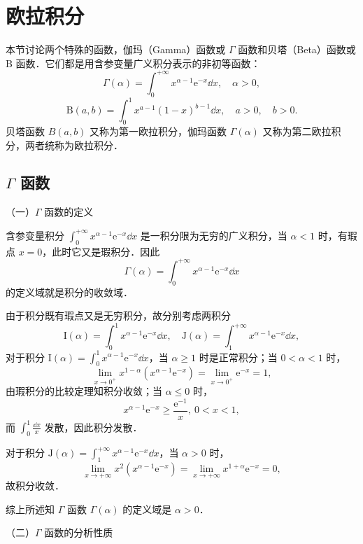 \section{欧拉积分}

本节讨论两个特殊的函数，伽玛（Gamma）函数或 $\Gamma$ 函数和贝塔（Beta）函数或 B 函数．它们都是用含参变量广义积分表示的非初等函数：
\[
\Gamma(\alpha)=\int_{0}^{+\infty}x^{\alpha-1}\mathrm{e}^{-x}\dd x,\quad\alpha>0,
\]
\[
\mathrm{B}(a,b)=\int_{0}^{1}x^{a-1}(1-x)^{b-1}\dd x,\quad a>0,\quad b>0.
\]
贝塔函数 $B(a,b)$ 又称为第一欧拉积分，伽玛函数 $\Gamma(\alpha)$ 又称为第二欧拉积分，两者统称为欧拉积分．

\subsection{$\Gamma$ 函数}

（一）$\Gamma$ 函数的定义

含参变量积分 $\displaystyle\int_{0}^{+\infty}x^{\alpha-1}\mathrm{e}^{-x}\dd x$ 是一积分限为无穷的广义积分，当 $\alpha<1$ 时，有瑕点 $x=0$，此时它又是瑕积分．因此
\[
\Gamma(\alpha)=\int_{0}^{+\infty}x^{\alpha-1}\mathrm{e}^{-x}\dd x
\]
的定义域就是积分的收敛域．

由于积分既有瑕点又是无穷积分，故分别考虑两积分
\[
\mathrm{I}(\alpha)=\int_{0}^{1}x^{\alpha-1}\mathrm{e}^{-x}\dd x,\quad \mathrm{J}(\alpha)=\int_{1}^{+\infty}x^{\alpha-1}\mathrm{e}^{-x}\dd x,
\]
对于积分 $\mathrm{I}(\alpha)=\displaystyle\int_{0}^{1}x^{\alpha-1}\mathrm{e}^{-x}\dd x$，当 $\alpha\geqslant 1$ 时是正常积分；当 $0<\alpha<1$ 时，
\[
\lim_{x\to 0^{+}}x^{1-\alpha}\left(x^{\alpha-1}\mathrm{e}^{-x}\right)=\lim_{x\to 0^{+}}\mathrm{e}^{-x}=1,
\]
由瑕积分的比较定理知积分收敛；当 $\alpha\leqslant 0$ 时，
\[
x^{\alpha-1}\mathrm{e}^{-x}\geqslant\frac{\mathrm{e}^{-1}}{x},\ 0<x<1,
\]
而 $\displaystyle\int_{0}^{1}\frac{\dd x}{x}$ 发散，因此积分发散．

对于积分 $\mathrm{J}(\alpha)=\displaystyle\int_{1}^{+\infty}x^{\alpha-1}\mathrm{e}^{-x}\dd x$，当 $\alpha>0$ 时，
\[
\lim_{x\to+\infty}x^{2}\left(x^{\alpha-1}\mathrm{e}^{-x}\right)=\lim_{x\to+\infty}x^{1+\alpha}\mathrm{e}^{-x}=0,
\]
故积分收敛．

综上所述知 $\Gamma$ 函数 $\Gamma(\alpha)$ 的定义域是 $\alpha>0$．

（二）$\Gamma$ 函数的分析性质

